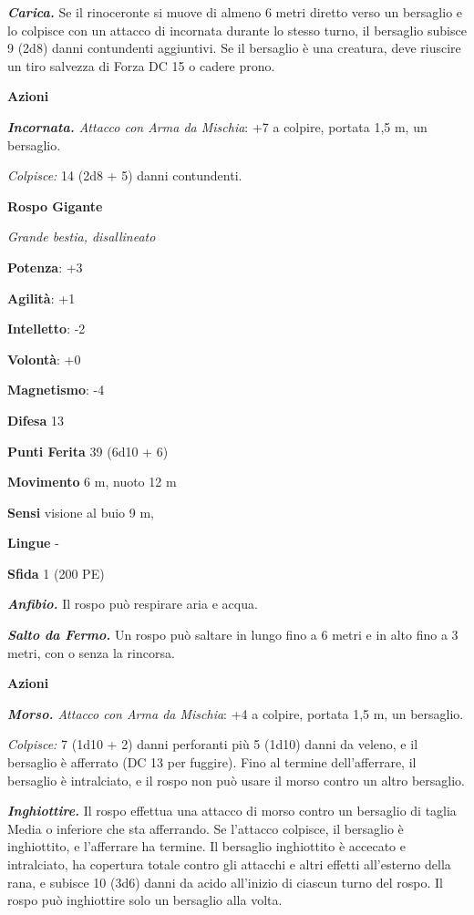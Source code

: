 \begin{multicols}{2}
\emph{\textbf{Carica.}} Se il rinoceronte si muove di almeno 6 metri
diretto verso un bersaglio e lo colpisce con un attacco di incornata
durante lo stesso turno, il bersaglio subisce 9 (2d8) danni contundenti
aggiuntivi. Se il bersaglio è una creatura, deve riuscire un tiro
salvezza di Forza DC 15 o cadere prono.

\textbf{Azioni}

\emph{\textbf{Incornata.} Attacco con Arma da Mischia}: +7 a colpire,
portata 1,5 m, un bersaglio.

\emph{Colpisce:} 14 (2d8 + 5) danni contundenti.

\textbf{Rospo Gigante}

\emph{Grande bestia, disallineato}

\textbf{Potenza}: +3

\textbf{Agilità}: +1

\textbf{Intelletto}: -2

\textbf{Volontà}: +0

\textbf{Magnetismo}: -4

\textbf{Difesa} 13

\textbf{Punti Ferita} 39 (6d10 + 6)

\textbf{Movimento} 6 m, nuoto 12 m

\textbf{Sensi} visione al buio 9 m, 

\textbf{Lingue} -

\textbf{Sfida} 1 (200 PE)

\emph{\textbf{Anfibio.}} Il rospo può respirare aria e acqua.

\emph{\textbf{Salto da Fermo.}} Un rospo può saltare in lungo fino a 6
metri e in alto fino a 3 metri, con o senza la rincorsa.

\textbf{Azioni}

\emph{\textbf{Morso.} Attacco con Arma da Mischia}: +4 a colpire,
portata 1,5 m, un bersaglio.

\emph{Colpisce:} 7 (1d10 + 2) danni perforanti più 5 (1d10) danni da
veleno, e il bersaglio è afferrato (DC 13 per fuggire). Fino al termine
dell'afferrare, il bersaglio è intralciato, e il rospo non può usare il
morso contro un altro bersaglio.

\emph{\textbf{Inghiottire.}} Il rospo effettua una attacco di morso
contro un bersaglio di taglia Media o inferiore che sta afferrando. Se
l'attacco colpisce, il bersaglio è inghiottito, e l'afferrare ha
termine. Il bersaglio inghiottito è accecato e intralciato, ha copertura
totale contro gli attacchi e altri effetti all'esterno della rana, e
subisce 10 (3d6) danni da acido all'inizio di ciascun turno del rospo.
Il rospo può inghiottire solo un bersaglio alla volta.


\end{multicols}
